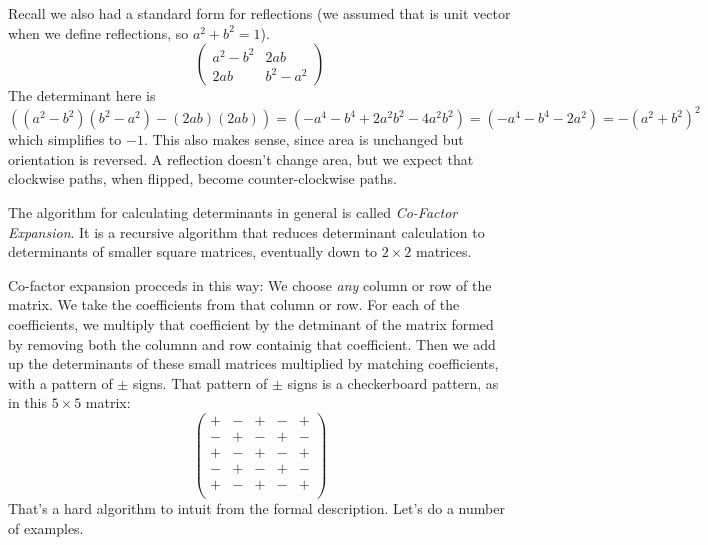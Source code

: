 \documentclass[fleqn,letterpaper]{report}
\begin{document}
\begin{example}
Recall we also had a standard form for reflections
(we assumed that  is unit vector
when we define reflections, so $a^2 + b^2 = 1$).
\begin{equation*}
\left( \begin{matrix}
a^2 - b^2 & 2ab \\ 2ab & b^2 - a^2
\end{matrix} \right) 
\end{equation*}
The determinant here is $( ( a^2 - b^2)(b^2
- a^2) - (2ab)(2ab)) = ( -a^4 - b^4 + 2a^2
 b^2 - 4a^2 b^2) = (-a^4 - b^4 - 2a^2) = -(a^2 + b^2)^2$
which simplifies to $-1$. This also makes sense, since area is
unchanged but orientation is reversed. A reflection doesn't
change area, but we expect that clockwise paths, when flipped,
become counter-clockwise paths.
\end{example}

\begin{defn}
The algorithm for calculating determinants in general is
called \emph{Co-Factor Expansion}. It is a recursive algorithm
that reduces determinant calculation to determinants of
smaller square matrices, eventually down to $2 \times 2$
matrices.
\end{defn}

Co-factor expansion procceds in this way: We choose \emph{any} column or
row of the matrix. We take the coefficients from that column
or row. For each of the coefficients, we multiply that
coefficient by the detminant of the matrix formed by removing
both the columnn and row containig that coefficient. Then we
add up the determinants of these small matrices multiplied by
matching coefficients, with a pattern of $\pm$ signs. That
pattern of $\pm$ signs is a checkerboard pattern, as in this
$5 \times 5$ matrix:
\begin{equation*}
\left( \begin{matrix}
+ & - & + & - & + \\
- & + & - & + & - \\
+ & - & + & - & + \\
- & + & - & + & - \\
+ & - & + & - & + \\
\end{matrix} \right) 
\end{equation*}
That's a hard algorithm to intuit from the formal description.
Let's do a number of examples. 
\end{document}
